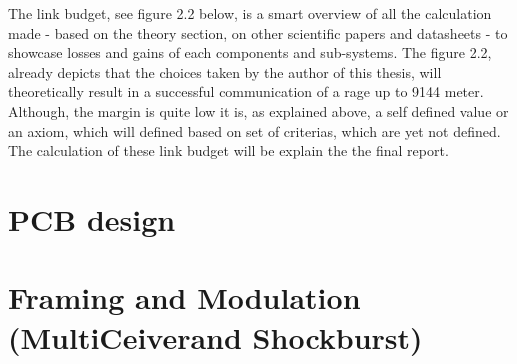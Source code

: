 The link budget, see figure 2.2 below, is a smart overview of all the calculation made - based on the theory section, on other scientific papers and datasheets - to showcase losses and gains of each components and sub-systems. The figure 2.2, already depicts that the choices taken by the author of this thesis, will theoretically result in a successful communication of a rage up to 9144 meter. Although, the margin is quite low it is, as explained above, a self defined value or an axiom, which will defined based on set of criterias, which are yet not defined. The calculation of these link budget will be explain the the final report. 



\section{PCB design}

\section{Framing and Modulation (MultiCeiver\texttrademark and Shockburst\texttrademark)}




